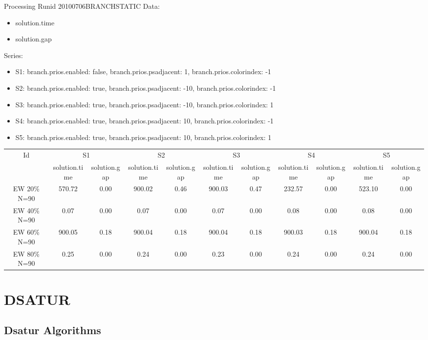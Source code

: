 \documentclass[landscape, 12pt]{report}
\begin{document}
	
	\clearpage
	
	Processing Runid 20100706BRANCHSTATIC
Data:
\begin{itemize}
\item solution.time
\item solution.gap
\end{itemize}
Series:
\begin{itemize}
\item S1: branch.prios.enabled: false, branch.prios.psadjacent: 1, branch.prios.colorindex: -1
\item S2: branch.prios.enabled: true, branch.prios.psadjacent: -10, branch.prios.colorindex: -1
\item S3: branch.prios.enabled: true, branch.prios.psadjacent: -10, branch.prios.colorindex: 1
\item S4: branch.prios.enabled: true, branch.prios.psadjacent: 10, branch.prios.colorindex: -1
\item S5: branch.prios.enabled: true, branch.prios.psadjacent: 10, branch.prios.colorindex: 1
\end{itemize}
\begin{tabular}{|c|cc|cc|cc|cc|cc|}
\hline
\multicolumn{1}{|c|}{Id} & \multicolumn{2}{|c|}{S1} & \multicolumn{2}{|c|}{S2} & \multicolumn{2}{|c|}{S3} & \multicolumn{2}{|c|}{S4} & \multicolumn{2}{|c|}{S5}
\\
 & solution.time & solution.gap & solution.time & solution.gap & solution.time & solution.gap & solution.time & solution.gap & solution.time & solution.gap
\\
\hline
EW 20\% N=90 & 570.72 & 0.00 & 900.02 & 0.46 & 900.03 & 0.47 & 232.57 & 0.00 & 523.10 & 0.00
\\
EW 40\% N=90 & 0.07 & 0.00 & 0.07 & 0.00 & 0.07 & 0.00 & 0.08 & 0.00 & 0.08 & 0.00
\\
EW 60\% N=90 & 900.05 & 0.18 & 900.04 & 0.18 & 900.04 & 0.18 & 900.03 & 0.18 & 900.04 & 0.18
\\
EW 80\% N=90 & 0.25 & 0.00 & 0.24 & 0.00 & 0.23 & 0.00 & 0.24 & 0.00 & 0.24 & 0.00
\\
\hline 
 \end{tabular}
		
		\clearpage
		
	\section{DSATUR}
	
	\subsection{Dsatur Algorithms}
	
\end{document}
